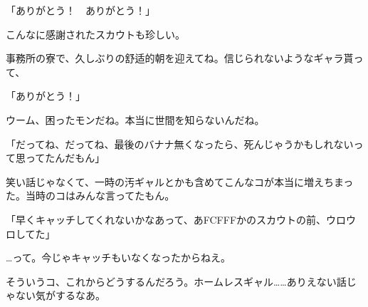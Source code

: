 \documentclass[12pt,UTF8]{ctexbook}
\begin{document}
{「ありがとう！　ありがとう！」

こんなに感謝されたスカウトも珍しい。

事務所の寮で、久しぶりの舒适的朝を迎えてね。信じられないようなギャラ貰って、

「ありがとう！」

ウーム、困ったモンだね。本当に世間を知らないんだね。

「だってね、だってね、最後のバナナ無くなったら、死んじゃうかもしれないって思ってたんだもん」

笑い話じゃなくて、一時の汚ギャルとかも含めてこんなコが本当に増えちまった。当時のコはみんな言ってたもん。

「早くキャッチしてくれないかなあって、あFCFFFかのスカウトの前、ウロウロしてた」

…って。今じゃキャッチもいなくなったからねえ。

そういうコ、これからどうするんだろう。ホームレスギャル……ありえない話じゃない気がするなあ。
}
\end{document}
